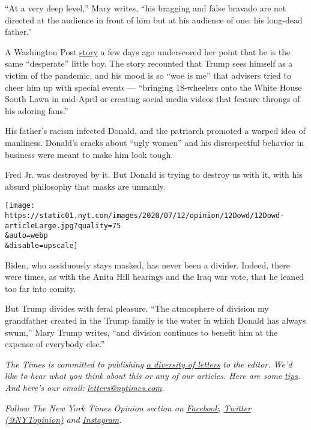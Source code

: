 ``At a very deep level,'' Mary writes, ``his bragging and false bravado
are not directed at the audience in front of him but at his audience of
one: his long-dead father.''

A Washington Post
\href{https://www.washingtonpost.com/politics/trump-the-victim-president-complains-in-private-about-the-pandemic-hurting-himself/2020/07/09/187142c6-c089-11ea-864a-0dd31b9d6917_story.html}{story}
a few days ago underscored her point that he is the same ``desperate''
little boy. The story recounted that Trump sees himself as a victim of
the pandemic, and his mood is so ``woe is me'' that advisers tried to
cheer him up with special events --- ``bringing 18-wheelers onto the
White House South Lawn in mid-April or creating social media videos that
feature throngs of his adoring fans.''

His father's racism infected Donald, and the patriarch promoted a warped
idea of manliness. Donald's cracks about ``ugly women'' and his
disrespectful behavior in business were meant to make him look tough.

Fred Jr. was destroyed by it. But Donald is trying to destroy us with
it, with his absurd philosophy that masks are unmanly.

\texttt{[image: https://static01.nyt.com/images/2020/07/12/opinion/12Dowd/12Dowd-articleLarge.jpg?quality=75\\\&auto=webp\\\&disable=upscale]}

Biden, who assiduously stays masked, has never been a divider. Indeed,
there were times, as with the Anita Hill hearings and the Iraq war vote,
that he leaned too far into comity.

But Trump divides with feral pleasure. ``The atmosphere of division my
grandfather created in the Trump family is the water in which Donald has
always swum,'' Mary Trump writes, ``and division continues to benefit
him at the expense of everybody else.''

\emph{The Times is committed to publishing}
\href{https://www.nytimes.com/2019/01/31/opinion/letters/letters-to-editor-new-york-times-women.html}{\emph{a
diversity of letters}} \emph{to the editor. We'd like to hear what you
think about this or any of our articles. Here are some}
\href{https://help.nytimes.com/hc/en-us/articles/115014925288-How-to-submit-a-letter-to-the-editor}{\emph{tips}}\emph{.
And here's our email:}
\href{mailto:letters@nytimes.com}{\emph{letters@nytimes.com}}\emph{.}

\emph{Follow The New York Times Opinion section on}
\href{https://www.facebook.com/nytopinion}{\emph{Facebook}}\emph{,}
\href{http://twitter.com/NYTOpinion}{\emph{Twitter (@NYTopinion)}}
\emph{and}
\href{https://www.instagram.com/nytopinion/}{\emph{Instagram}}\emph{.}

